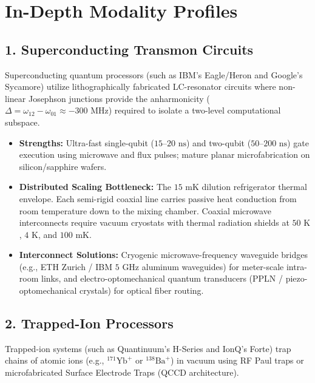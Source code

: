 \section{In-Depth Modality Profiles}
\label{sec:app_modality_profiles}

\subsection{1. Superconducting Transmon Circuits}
Superconducting quantum processors (such as IBM's Eagle/Heron and Google's Sycamore) utilize lithographically fabricated LC-resonator circuits where non-linear Josephson junctions provide the anharmonicity ($\Delta = \omega_{12} - \omega_{01} \approx -300\text{ MHz}$) required to isolate a two-level computational subspace.

\begin{itemize}
    \item \textbf{Strengths:} Ultra-fast single-qubit ($15\text{--}20\text{ ns}$) and two-qubit ($50\text{--}200\text{ ns}$) gate execution using microwave and flux pulses; mature planar microfabrication on silicon/sapphire wafers.
    \item \textbf{Distributed Scaling Bottleneck:} The $15\text{ mK}$ dilution refrigerator thermal envelope. Each semi-rigid coaxial line carries passive heat conduction from room temperature down to the mixing chamber. Coaxial microwave interconnects require vacuum cryostats with thermal radiation shields at $50\text{ K}$, $4\text{ K}$, and $100\text{ mK}$.
    \item \textbf{Interconnect Solutions:} Cryogenic microwave-frequency waveguide bridges (e.g., ETH Zurich / IBM $5\text{ GHz}$ aluminum waveguides) for meter-scale intra-room links, and electro-optomechanical quantum transducers (PPLN / piezo-optomechanical crystals) for optical fiber routing.
\end{itemize}

\subsection{2. Trapped-Ion Processors}
Trapped-ion systems (such as Quantinuum's H-Series and IonQ's Forte) trap chains of atomic ions (e.g., $^{171}\text{Yb}^+$ or $^{138}\text{Ba}^+$) in vacuum using RF Paul traps or microfabricated Surface Electrode Traps (QCCD architecture).

